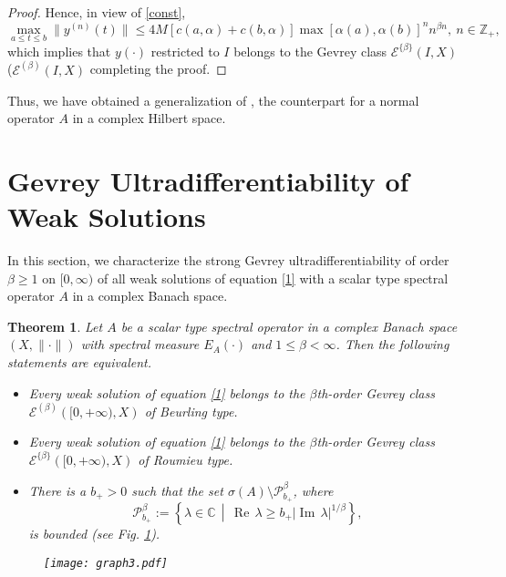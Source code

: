 \documentclass{amsart}
\theoremstyle{plain}
\newtheorem{thm}{Theorem}[section]
\theoremstyle{definition}
\begin{document}
\begin{proof}
Hence, in view of \eqref{const},
\begin{equation*}
\max_{a\le t\le b}\|y^{(n)}(t)\|\le 4M[c(a,\alpha)+c(b,\alpha)]
\max\left[\alpha(a),\alpha(b)\right]^nn^{\beta n},
\ n\in {{\mathbb Z}}_+,
\end{equation*}
which implies that $y(\cdot)$ restricted to $I$
belongs to the Gevrey class ${\mathscr E}^{\{\beta\}}(I,X)$ (${\mathscr E}^{(\beta)}(I,X)$ completing the proof.
\end{proof}

Thus, we have obtained a generalization of 
{\cite[Proposition $3.1$]{Markin2001(1)}}, the counterpart for a normal operator $A$ in a complex Hilbert space. 

\section{Gevrey Ultradifferentiability of Weak Solutions}

In this section, we characterize the strong Gevrey ultradifferentiability of order $\beta\ge 1$ on $[0,\infty)$ of all weak solutions of equation \eqref{1} with a scalar type spectral operator $A$ in a complex Banach space.

\begin{thm}\label{closed}
Let $A$ be a scalar type spectral operator in a complex Banach space $(X,\|\cdot\|)$ with spectral measure $E_A(\cdot)$ and $ 1\le \beta<\infty$. Then the following statements are equivalent. 
\begin{itemize}
\item[\textup{(i)}] Every weak solution of equation \eqref{1} belongs to the $\beta$th-order Gevrey class 
${\mathscr E}^{(\beta )}\left([0,+\infty),X\right)$
of Beurling type.
\item[\textup{(ii)}] Every weak solution of equation \eqref{1} belongs to the $\beta$th-order Gevrey class 
${\mathscr E}^{\{\beta \}}\left( [0,+\infty),X\right)$
of Roumieu type.
\item[\textup{(iii)}] There is a $b_+>0$ such that the set
$\sigma(A)\setminus {\mathscr P}^{\beta}_{b_+}$,
where
\begin{equation*}
{\mathscr P}^{\beta}_{b_+}:= \left\{ \lambda \in {{\mathbb C}}\, \middle|\,
\operatorname{Re\,}\lambda \ge b_+|\operatorname{Im\,}\lambda|^{1/\beta}\right\},
\end{equation*}
is bounded 
(see Fig. \ref{fig:graph3}).
\end{itemize}
\begin{figure}[h]
\centering
\texttt{[image: graph3.pdf]}
\caption[]{}
\label{fig:graph3}
\end{figure}
\end{thm}
\end{document}
